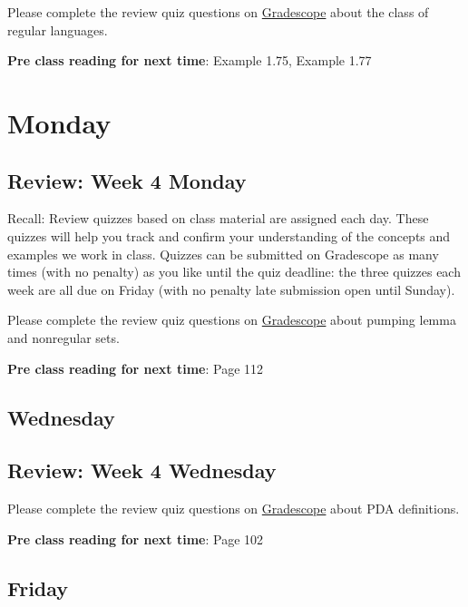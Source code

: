 Please complete the review quiz questions on \href{http://gradescope.com}{Gradescope} about 
the class of regular languages.

{\bf Pre class reading for next time}: Example 1.75, Example 1.77
\newpage

\section*{Monday}


    
\subsection*{Review: Week 4 Monday}


Recall: Review quizzes based on class material are assigned each day. 
These quizzes will help you track and confirm your understanding of the concepts and examples 
we work in class. Quizzes can be submitted on Gradescope as many times (with no penalty) as 
you like until the quiz deadline: the three quizzes each week are all due on Friday (with no penalty 
late submission open until Sunday).

Please complete the review quiz questions on \href{http://gradescope.com}{Gradescope} about 
pumping lemma and nonregular sets.

{\bf Pre class reading for next time}: Page 112


\newpage
\subsection*{Wednesday}



\subsection*{Review: Week 4 Wednesday}

Please complete the review quiz questions on \href{http://gradescope.com}{Gradescope} about 
PDA definitions.

{\bf Pre class reading for next time}: Page 102



\newpage
\subsection*{Friday}

